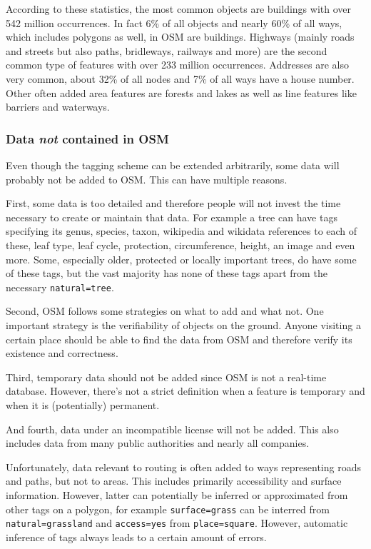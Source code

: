 			According to these statistics, the most common objects are buildings with over 542 million occurrences.
			In fact 6\% of all objects and nearly 60\% of all ways, which includes polygons as well, in OSM are buildings.
			Highways (mainly roads and streets but also paths, bridleways, railways and more) are the second common type of features with over 233 million occurrences.
			Addresses are also very common, about 32\% of all nodes and 7\% of all ways have a house number.
			Other often added area features are forests and lakes as well as line features like barriers and waterways.
			
		\subsubsection{Data \textit{not} contained in OSM}
		
			Even though the tagging scheme can be extended arbitrarily, some data will probably not be added to OSM.
			This can have multiple reasons.
			
			First, some data is too detailed and therefore people will not invest the time necessary to create or maintain that data.
			For example a tree can have tags specifying its genus, species, taxon, wikipedia and wikidata references to each of these, leaf type, leaf cycle, protection, circumference, height, an image and even more. Some, especially older, protected or locally important trees, do have some of these tags, but the vast majority has none of these tags apart from the necessary \texttt{natural=tree}.
			
			Second, OSM follows some strategies on what to add and what not.
			One important strategy is the verifiability of objects on the ground.
			Anyone visiting a certain place should be able to find the data from OSM and therefore verify its existence and correctness.
			
			Third, temporary data should not be added since OSM is not a real-time database.
			However, there's not a strict definition when a feature is temporary and when it is (potentially) permanent.
			
			And fourth, data under an incompatible license will not be added.
			This also includes data from many public authorities and nearly all companies.
			
			Unfortunately, data relevant to routing is often added to ways representing roads and paths, but not to areas.
			This includes primarily accessibility and surface information.
			However, latter can potentially be inferred or approximated from other tags on a polygon, for example \texttt{surface=grass} can be interred from \texttt{natural=grassland} and \texttt{access=yes} from \texttt{place=square}.
			However, automatic inference of tags always leads to a certain amount of errors.
			
